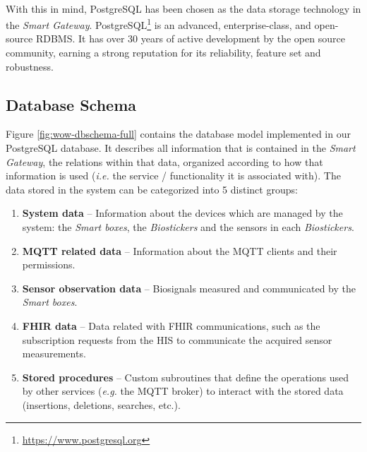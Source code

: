 \paragraph{} With this in mind, PostgreSQL has been chosen as the data storage technology in the \textit{Smart Gateway}. PostgreSQL\footnote{\url{https://www.postgresql.org}} is an advanced, enterprise-class, and open-source \acs{RDBMS}. It has over 30 years of active development by the open source community, earning a strong reputation for its reliability, feature set and robustness.

\subsection{Database Schema}
Figure \ref{fig:wow-dbschema-full} contains the database model implemented in our PostgreSQL database. It describes all information that is contained in the \textit{Smart Gateway}, the relations within that data, organized according to how that information is used (\textit{i.e.} the service / functionality it is associated with). The data stored in the system can be categorized into 5 distinct groups:

\begin{enumerate}
    \item \textbf{System data} -- Information about the devices which are managed by the system: the \textit{Smart boxes}, the \textit{Biostickers} and the sensors in each \textit{Biostickers}. 
    \item \textbf{\acs{MQTT} related data} -- Information about the \acs{MQTT} clients and their permissions. 
    \item \textbf{Sensor observation data} -- Biosignals measured and communicated by the \textit{Smart boxes}.
    \item \textbf{\acs{FHIR} data} -- Data related with \acs{FHIR} communications, such as the subscription requests from the \acs{HIS} to communicate the acquired sensor measurements.
    \item \textbf{Stored procedures} -- Custom subroutines that define the operations used by other services (\textit{e.g.} the \acs{MQTT} broker) to interact with the stored data (insertions, deletions, searches, etc.).
\end{enumerate}

\clearpage 

